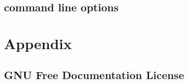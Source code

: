 \documentclass{report}
\begin{document}


\chapter{\spatch command line options}




\part{Appendix}

\chapter{GNU Free Documentation License}



{\small


}


\end{document}
